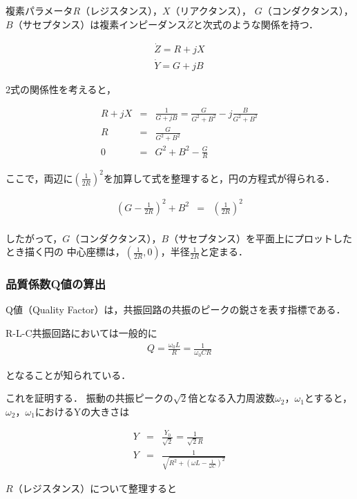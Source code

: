 \documentclass[dvipdfmx,titlepage,a4j]{jsarticle}  %
\numberwithin{equation}{section}
\begin{document}
複素パラメータ$R$（レジスタンス），$X$（リアクタンス），
$G$（コンダクタンス），$B$（サセプタンス）は複素インピーダンス$\dot{Z}$と次式のような関係を持つ．

\begin{eqnarray}
  \dot{Z} = R + jX \\
  \dot{Y} = G + jB
\end{eqnarray}

2式の関係性を考えると，

\begin{eqnarray}
  R + jX &=& \frac{1}{G + jB} = \frac{G}{G^2 + B^2} -j\frac{B}{G^2 + B^2} \\
  R &=& \frac{G}{G^2 + B^2} \\
  0 &=& G^2 + B^2 - \frac{G}{R}
\end{eqnarray}

ここで，両辺に$(\frac{1}{2R})^2$を加算して式を整理すると，円の方程式が得られる．

\begin{eqnarray}
  (G - \frac{1}{2R})^2 + B^2 &=& (\frac{1}{2R})^2 \\
\end{eqnarray}

したがって，$G$（コンダクタンス），$B$（サセプタンス）を平面上にプロットしたとき描く円の
中心座標は，$(\frac{1}{2R}, 0)$，半径$\frac{1}{2R}$と定まる．

\subsubsection{品質係数Q値の算出}
Q値（Quality Factor）は，共振回路の共振のピークの鋭さを表す指標である．

R-L-C共振回路においては一般的に
\begin{eqnarray}
  Q = \frac{\omega_0 L}{R} = \frac{1}{\omega_0 CR}
\end{eqnarray}

となることが知られている．

これを証明する．
振動の共振ピークの$\sqrt{2}$倍となる入力周波数$\omega_2$，$\omega_1$とすると，
$\omega_2$，$\omega_1$におけるYの大きさは

\begin{eqnarray}
  Y &=& \frac{Y_0}{\sqrt{2}} = \frac{1}{\sqrt{2}R} \\
  Y &=& \frac{1}{\sqrt{R^2 + (\omega L - \frac{1}{\omega C})^2}}
\end{eqnarray}

$R$（レジスタンス）について整理すると
\end{document}
